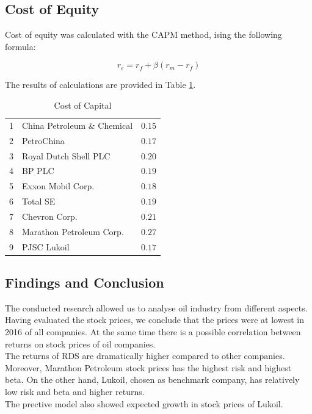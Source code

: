 \documentclass [a4paper, 11pt] {article}
\begin{document}
\clearpage
\subsection {Cost of Equity}

Cost of equity was calculated with the CAPM method, ising the following formula:

$$ r_e = r_f + \beta (r_m - r_f)$$

The results of calculations are provided in Table \ref{tab:r_e}.

\begin{table}[!h]
\caption{Cost of Capital\label{r}} 
\begin{center}
\begin{tabular}{llr}
\hline\hline
1&China Petroleum \& Chemical&$0.15$\tabularnewline
2&PetroChina&$0.17$\tabularnewline
3&Royal Dutch Shell PLC&$0.20$\tabularnewline
4&BP PLC&$0.19$\tabularnewline
5&Exxon Mobil Corp.&$0.18$\tabularnewline
6&Total SE&$0.19$\tabularnewline
7&Chevron Corp.&$0.21$\tabularnewline
8&Marathon Petroleum Corp.&$0.27$\tabularnewline
9&PJSC Lukoil&$0.17$\tabularnewline
\hline
\end{tabular}\end{center}
\label{tab:r_e}
\end{table}



\clearpage
\subsection {Findings and Conclusion}
The conducted research allowed us to analyse oil industry from different aspects. \\
Having evaluated the stock prices, we conclude that the prices were at lowest in 2016 of all companies.
At the same time there is a possible correlation between returns on stock prices of oil companies. \\
The returns of RDS are dramatically higher compared to other companies. \\
Moreover, Marathon Petroleum stock prices has the highest risk and highest beta. On the other hand, Lukoil, chosen as benchmark company, has relatively low risk and beta and higher returns.\\
The prective model also showed expected growth in stock prices of Lukoil.

\clearpage
\newpage
\printbibliography [heading=bibintoc]
\end{document}
